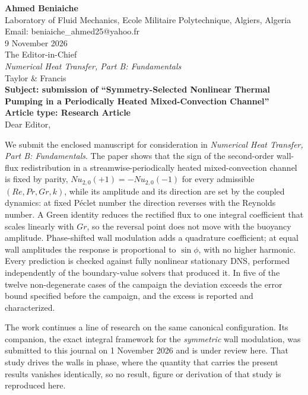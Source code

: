 \documentclass[11pt]{article}
\newcommand{\Rey}{\mathit{Re}}
\newcommand{\Grr}{\mathit{Gr}}
\newcommand{\Prn}{\mathit{Pr}}
\newcommand{\Nu}{\mathit{Nu}}
\let\Pr\Prn
\begin{document}
\textbf{Ahmed Beniaiche}\\
Laboratory of Fluid Mechanics, Ecole Militaire Polytechnique, Algiers, Algeria\\
Email: beniaiche\_ahmed25@yahoo.fr\\[3pt]
9 November 2026\\[5pt]

The Editor-in-Chief\\
\emph{Numerical Heat Transfer, Part B: Fundamentals}\\
Taylor \& Francis\\

\medskip
\textbf{Subject: submission of ``Symmetry-Selected Nonlinear Thermal Pumping in a
Periodically Heated Mixed-Convection Channel''}\\
\textbf{Article type: Research Article}\\[3pt]

Dear Editor,

We submit the enclosed manuscript for consideration in \emph{Numerical Heat Transfer, Part B:
Fundamentals}. The paper shows that the sign of the second-order wall-flux redistribution in a
streamwise-periodically heated mixed-convection channel is fixed by parity,
$\Nu_{2,0}(+1)=-\Nu_{2,0}(-1)$ for every admissible $(\Rey,\Pr,\Grr,k)$, while its amplitude
and its direction are set by the coupled dynamics: at fixed P\'eclet number the direction
reverses with the Reynolds number. A Green identity reduces the rectified flux to one integral
coefficient that scales linearly with $\Grr$, so the reversal point does not move with the
buoyancy amplitude. Phase-shifted wall modulation adds a quadrature coefficient; at equal wall
amplitudes the response is proportional to $\sin\phi$, with no higher harmonic. Every prediction
is checked against fully nonlinear stationary DNS, performed independently of the
boundary-value solvers that produced it. In five of the twelve non-degenerate cases of the
campaign the deviation exceeds the error bound specified before the campaign, and the excess
is reported and characterized.

\medskip
The work continues a line of research on the same canonical configuration. Its companion, the
exact integral framework for the \emph{symmetric} wall modulation, was submitted to this
journal on 1 November 2026 and is under review here. That study drives the walls in phase,
where the quantity that carries the present results vanishes identically, so no result, figure
or derivation of that study is reproduced here.
\end{document}
